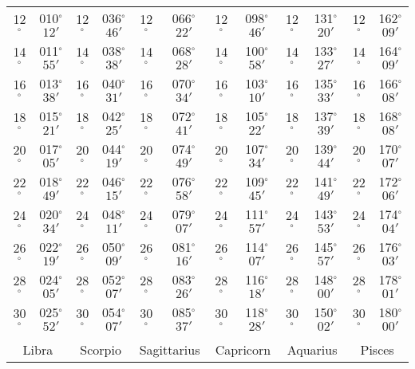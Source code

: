 \begin{table}
{\begin{tabular}{cc|cc|cc|cc|cc|cc}
12$^\circ$ & 010$^\circ$$12'$ & 12$^\circ$ & 036$^\circ$$46'$ & 12$^\circ$ & 066$^\circ$$22'$ & 12$^\circ$ & 098$^\circ$$46'$ & 12$^\circ$ & 131$^\circ$$20'$ & 12$^\circ$ & 162$^\circ$$09'$\\
14$^\circ$ & 011$^\circ$$55'$ & 14$^\circ$ & 038$^\circ$$38'$ & 14$^\circ$ & 068$^\circ$$28'$ & 14$^\circ$ & 100$^\circ$$58'$ & 14$^\circ$ & 133$^\circ$$27'$ & 14$^\circ$ & 164$^\circ$$09'$\\
16$^\circ$ & 013$^\circ$$38'$ & 16$^\circ$ & 040$^\circ$$31'$ & 16$^\circ$ & 070$^\circ$$34'$ & 16$^\circ$ & 103$^\circ$$10'$ & 16$^\circ$ & 135$^\circ$$33'$ & 16$^\circ$ & 166$^\circ$$08'$\\
18$^\circ$ & 015$^\circ$$21'$ & 18$^\circ$ & 042$^\circ$$25'$ & 18$^\circ$ & 072$^\circ$$41'$ & 18$^\circ$ & 105$^\circ$$22'$ & 18$^\circ$ & 137$^\circ$$39'$ & 18$^\circ$ & 168$^\circ$$08'$\\
20$^\circ$ & 017$^\circ$$05'$ & 20$^\circ$ & 044$^\circ$$19'$ & 20$^\circ$ & 074$^\circ$$49'$ & 20$^\circ$ & 107$^\circ$$34'$ & 20$^\circ$ & 139$^\circ$$44'$ & 20$^\circ$ & 170$^\circ$$07'$\\
22$^\circ$ & 018$^\circ$$49'$ & 22$^\circ$ & 046$^\circ$$15'$ & 22$^\circ$ & 076$^\circ$$58'$ & 22$^\circ$ & 109$^\circ$$45'$ & 22$^\circ$ & 141$^\circ$$49'$ & 22$^\circ$ & 172$^\circ$$06'$\\
24$^\circ$ & 020$^\circ$$34'$ & 24$^\circ$ & 048$^\circ$$11'$ & 24$^\circ$ & 079$^\circ$$07'$ & 24$^\circ$ & 111$^\circ$$57'$ & 24$^\circ$ & 143$^\circ$$53'$ & 24$^\circ$ & 174$^\circ$$04'$\\
26$^\circ$ & 022$^\circ$$19'$ & 26$^\circ$ & 050$^\circ$$09'$ & 26$^\circ$ & 081$^\circ$$16'$ & 26$^\circ$ & 114$^\circ$$07'$ & 26$^\circ$ & 145$^\circ$$57'$ & 26$^\circ$ & 176$^\circ$$03'$\\
28$^\circ$ & 024$^\circ$$05'$ & 28$^\circ$ & 052$^\circ$$07'$ & 28$^\circ$ & 083$^\circ$$26'$ & 28$^\circ$ & 116$^\circ$$18'$ & 28$^\circ$ & 148$^\circ$$00'$ & 28$^\circ$ & 178$^\circ$$01'$\\
30$^\circ$ & 025$^\circ$$52'$ & 30$^\circ$ & 054$^\circ$$07'$ & 30$^\circ$ & 085$^\circ$$37'$ & 30$^\circ$ & 118$^\circ$$28'$ & 30$^\circ$ & 150$^\circ$$02'$ & 30$^\circ$ & 180$^\circ$$00'$\\
\multicolumn{12}{c}{}\\
\multicolumn{2}{c}{Libra}\vline & \multicolumn{2}{c}{Scorpio} \vline& \multicolumn{2}{c}{Sagittarius} \vline& \multicolumn{2}{c}{Capricorn}\vline &
\multicolumn{2}{c}{Aquarius}\vline & \multicolumn{2}{c}{Pisces}\\\hline

\end{tabular}}
\end{table}
